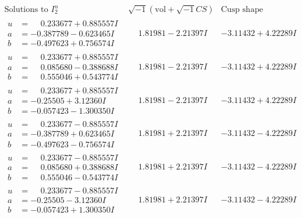 \documentclass[1p]{elsarticle_modified}
\theoremstyle{definition}
\newcommand{\I}{\sqrt{-1}}
\begin{document}
$$\begin{array}{c|c|c}  
\text{Solutions to }I^u_{2}& \I (\text{vol} + \sqrt{-1}CS) & \text{Cusp shape}\\
 \hline 
\begin{aligned}
u &= \phantom{-}0.233677 + 0.885557 I \\
a &= -0.387789 - 0.623465 I \\
b &= -0.497623 + 0.756574 I\end{aligned}
 & \phantom{-}1.81981 - 2.21397 I & -3.11432 + 4.22289 I \\ \hline\begin{aligned}
u &= \phantom{-}0.233677 + 0.885557 I \\
a &= \phantom{-}0.085680 - 0.388688 I \\
b &= \phantom{-}0.555046 + 0.543774 I\end{aligned}
 & \phantom{-}1.81981 - 2.21397 I & -3.11432 + 4.22289 I \\ \hline\begin{aligned}
u &= \phantom{-}0.233677 + 0.885557 I \\
a &= -0.25505 + 3.12360 I \\
b &= -0.057423 - 1.300350 I\end{aligned}
 & \phantom{-}1.81981 - 2.21397 I & -3.11432 + 4.22289 I \\ \hline\begin{aligned}
u &= \phantom{-}0.233677 - 0.885557 I \\
a &= -0.387789 + 0.623465 I \\
b &= -0.497623 - 0.756574 I\end{aligned}
 & \phantom{-}1.81981 + 2.21397 I & -3.11432 - 4.22289 I \\ \hline\begin{aligned}
u &= \phantom{-}0.233677 - 0.885557 I \\
a &= \phantom{-}0.085680 + 0.388688 I \\
b &= \phantom{-}0.555046 - 0.543774 I\end{aligned}
 & \phantom{-}1.81981 + 2.21397 I & -3.11432 - 4.22289 I \\ \hline\begin{aligned}
u &= \phantom{-}0.233677 - 0.885557 I \\
a &= -0.25505 - 3.12360 I \\
b &= -0.057423 + 1.300350 I\end{aligned}
 & \phantom{-}1.81981 + 2.21397 I & -3.11432 - 4.22289 I \\ \hline\begin{aligned}

\end{aligned}
\end{array}$$
\end{document}
